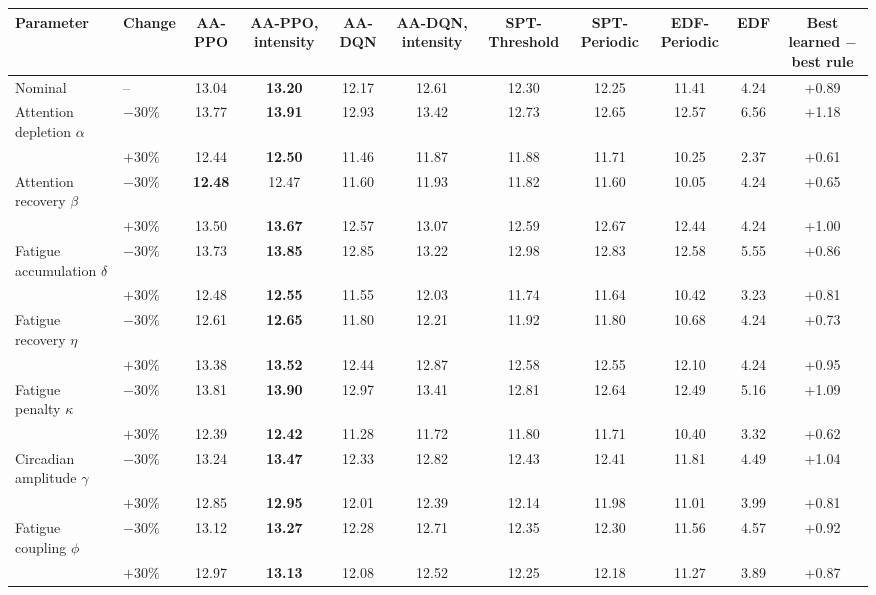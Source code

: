 \begin{tabular}{llccccccccc}
\toprule
Parameter & Change & AA-PPO & AA-PPO, intensity & AA-DQN & AA-DQN, intensity & SPT-Threshold & SPT-Periodic & EDF-Periodic & EDF & Best learned $-$ best rule \\
\midrule
Nominal & -- & 13.04 & \textbf{13.20} & 12.17 & 12.61 & 12.30 & 12.25 & 11.41 & 4.24 & +0.89 \\
Attention depletion $\alpha$ & $-30\%$ & 13.77 & \textbf{13.91} & 12.93 & 13.42 & 12.73 & 12.65 & 12.57 & 6.56 & +1.18 \\
 & $+30\%$ & 12.44 & \textbf{12.50} & 11.46 & 11.87 & 11.88 & 11.71 & 10.25 & 2.37 & +0.61 \\
Attention recovery $\beta$ & $-30\%$ & \textbf{12.48} & 12.47 & 11.60 & 11.93 & 11.82 & 11.60 & 10.05 & 4.24 & +0.65 \\
 & $+30\%$ & 13.50 & \textbf{13.67} & 12.57 & 13.07 & 12.59 & 12.67 & 12.44 & 4.24 & +1.00 \\
Fatigue accumulation $\delta$ & $-30\%$ & 13.73 & \textbf{13.85} & 12.85 & 13.22 & 12.98 & 12.83 & 12.58 & 5.55 & +0.86 \\
 & $+30\%$ & 12.48 & \textbf{12.55} & 11.55 & 12.03 & 11.74 & 11.64 & 10.42 & 3.23 & +0.81 \\
Fatigue recovery $\eta$ & $-30\%$ & 12.61 & \textbf{12.65} & 11.80 & 12.21 & 11.92 & 11.80 & 10.68 & 4.24 & +0.73 \\
 & $+30\%$ & 13.38 & \textbf{13.52} & 12.44 & 12.87 & 12.58 & 12.55 & 12.10 & 4.24 & +0.95 \\
Fatigue penalty $\kappa$ & $-30\%$ & 13.81 & \textbf{13.90} & 12.97 & 13.41 & 12.81 & 12.64 & 12.49 & 5.16 & +1.09 \\
 & $+30\%$ & 12.39 & \textbf{12.42} & 11.28 & 11.72 & 11.80 & 11.71 & 10.40 & 3.32 & +0.62 \\
Circadian amplitude $\gamma$ & $-30\%$ & 13.24 & \textbf{13.47} & 12.33 & 12.82 & 12.43 & 12.41 & 11.81 & 4.49 & +1.04 \\
 & $+30\%$ & 12.85 & \textbf{12.95} & 12.01 & 12.39 & 12.14 & 11.98 & 11.01 & 3.99 & +0.81 \\
Fatigue coupling $\phi$ & $-30\%$ & 13.12 & \textbf{13.27} & 12.28 & 12.71 & 12.35 & 12.30 & 11.56 & 4.57 & +0.92 \\
 & $+30\%$ & 12.97 & \textbf{13.13} & 12.08 & 12.52 & 12.25 & 12.18 & 11.27 & 3.89 & +0.87 \\
\bottomrule
\end{tabular}